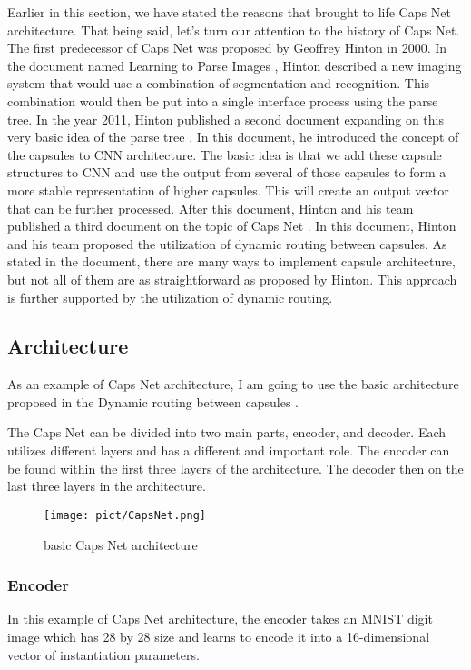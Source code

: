         Earlier in this section, we have stated the reasons that brought to life Caps Net architecture. That being said, let's turn our attention to the history of Caps Net. 
        The first predecessor of Caps Net was proposed by Geoffrey Hinton in 2000. In the document named Learning to Parse Images \cite{Learning To Parse Images}, 
        Hinton described a new imaging system that would use a combination of segmentation and recognition. 
        This combination would then be put into a single interface process using the parse tree. 
        In the year 2011, Hinton published a second document expanding on this very basic idea of the parse tree \cite{Transforming Auto-Encoders}. 
        In this document, he introduced the concept of the capsules to CNN architecture. 
        The basic idea is that we add these capsule structures to CNN and use the output from several of those capsules to form a more stable representation of higher capsules. 
        This will create an output vector that can be further processed.  After this document, Hinton and his team published a third document on the topic of Caps Net \cite{Dynamic routing between capsules}.
        In this document, Hinton and his team proposed the utilization of dynamic routing between capsules. 
        As stated in the document, there are many ways to implement capsule architecture, but not all of them are as straightforward as proposed by Hinton. 
        This approach is further supported by the utilization of dynamic routing. 
    \subsection{Architecture}
        As an example of Caps Net architecture, I am going to use the basic architecture proposed in the Dynamic routing between capsules \cite{Dynamic routing between capsules}. 

        The Caps Net can be divided into two main parts, encoder, and decoder. Each utilizes different layers and has a different and important role. 
        The encoder can be found within the first three layers of the architecture. 
        The decoder then on the last three layers in the architecture.
        \begin{figure}[h]
            \centering
            \texttt{[image: pict/CapsNet.png]}
            \caption{basic Caps Net architecture \cite{Dynamic routing between capsules}}
            \label{fig:CapsNet architecture}
        \end{figure}
        \subsubsection{Encoder}
            In this example of Caps Net architecture, the encoder takes an MNIST digit image which has 28 by 28
            size and learns to encode it into a 16-dimensional vector of instantiation parameters. 

